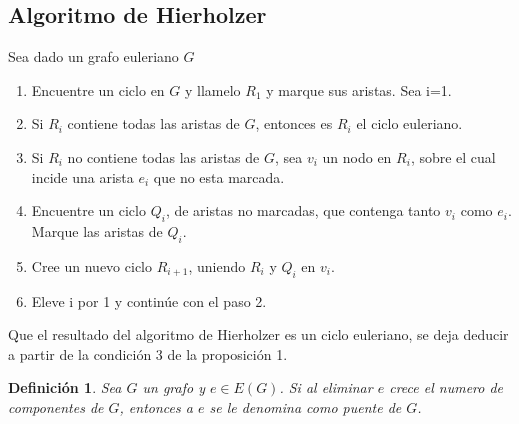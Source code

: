 \documentclass[12pt]{article}
\newtheorem{definition}{Definición}
\begin{document}
\subsection{Algoritmo de Hierholzer}
Sea dado un grafo euleriano $G$
\begin{enumerate}
\item Encuentre un ciclo en $G$ y llamelo $R_{1}$ y marque sus aristas. Sea i=1.
\item Si $R_{i}$ contiene todas las aristas de $G$, entonces es $R_{i}$ el ciclo euleriano.
\item Si $R_{i}$ no contiene todas las aristas de $G$, sea $v_{i}$ un nodo en $R_{i}$, sobre el cual incide una arista $e_{i}$ que no esta marcada.
\item Encuentre un ciclo $Q_{i}$, de aristas no marcadas, que contenga tanto $v_{i}$ como $e_{i}$. Marque las aristas de $Q_{i}$.
\item Cree un nuevo ciclo $R_{i+1}$, uniendo $R_{i}$ y $Q_{i}$ en $v_{i}$.
\item Eleve i por 1 y continúe con el paso 2.
\end{enumerate}
Que el resultado del algoritmo de Hierholzer es un ciclo euleriano, se deja deducir a partir de la condición 3 de la proposición 1.
\begin{definition}
Sea $G$ un grafo y $e \in E(G)$. Si al eliminar $e$ crece el numero de componentes de $G$, entonces a $e$ se le denomina como puente de $G$.
\end{definition}
\end{document}
